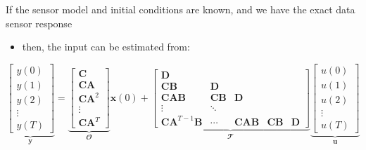\documentclass[presentation]{beamer}
\begin{document}
\begin{frame}[label={slide:preliminaries2}]{If the sensor model and initial conditions are known, and we have the exact data sensor response}
\begin{itemize}
\item  then, the input can be estimated from: 
\end{itemize}
\begin{equation*} 
\underbrace{ \begin{bmatrix} y(0) \\ y(1) \\ y(2) \\ \vdots \\ y(T) \end{bmatrix} }_{\mathbf{y}}
 = \underbrace{ \begin{bmatrix} \mathbf{C} \\ \mathbf{C} \mathbf{A} \\ \mathbf{C} \mathbf{A}^2 \\ \vdots \\ \mathbf{C} \mathbf{A}^T \end{bmatrix} }_{\mathbfcal{O}} \mathbf{x}(0) +
 \underbrace{ \begin{bmatrix} \mathbf{D} \\ \mathbf{C} \mathbf{B} & \mathbf{D} \\ \mathbf{C} \mathbf{A} \mathbf{B} & \mathbf{C} \mathbf{B} & \mathbf{D} \\ \vdots & \ddots \\ \mathbf{C} \mathbf{A}^{T-1} \mathbf{B} & \cdots  &  \mathbf{C} \mathbf{A} \mathbf{B} & \mathbf{C} \mathbf{B} & \mathbf{D} \end{bmatrix} }_{\mathbfcal{T}} \underbrace{ \begin{bmatrix} u(0) \\ u(1) \\ u(2) \\ \vdots \\ u(T) \end{bmatrix} }_{\mathbf{u}} \end{equation*}
\end{frame}
\end{document}

